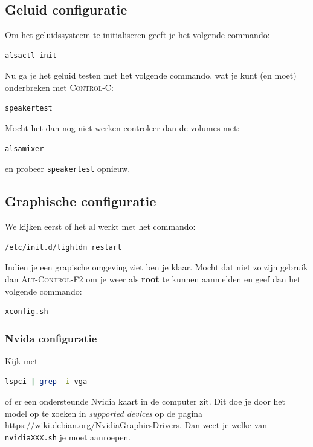 \documentclass[12pt,a4paper]{article}
\begin{document}
\subsection{Geluid configuratie}

Om het geluidssysteem te initialiseren geeft je het volgende commando:

\begin{lstlisting}[language=bash]
alsactl init
\end{lstlisting}

Nu ga je het geluid testen met het volgende commando, wat je kunt (en moet) onderbreken met \textsc{Control-C}:

\begin{lstlisting}[language=bash]
speakertest
\end{lstlisting}

Mocht het dan nog niet werken controleer dan de volumes met:

\begin{lstlisting}[language=bash]
alsamixer
\end{lstlisting}

en probeer \texttt{speakertest} opnieuw.


\subsection{Graphische configuratie}

We kijken eerst of het al werkt met het commando:

\begin{lstlisting}[language=bash]
/etc/init.d/lightdm restart
\end{lstlisting}

Indien je een grapische omgeving ziet ben je klaar. Mocht dat niet zo zijn gebruik dan \textsc{Alt-Control-F2} om je weer als \textbf{root} te kunnen aanmelden en geef dan het volgende commando:


\begin{lstlisting}[language=bash]
xconfig.sh
\end{lstlisting}

\subsubsection{Nvida configuratie}

Kijk met 
\begin{lstlisting}[language=bash]
lspci | grep -i vga
\end{lstlisting}

of er een ondersteunde Nvidia kaart in de computer zit. Dit doe je door het model op te zoeken in \textit{supported devices} op de pagina \url{https://wiki.debian.org/NvidiaGraphicsDrivers}. Dan weet je welke van \texttt{nvidiaXXX.sh} je moet aanroepen.
\end{document}

